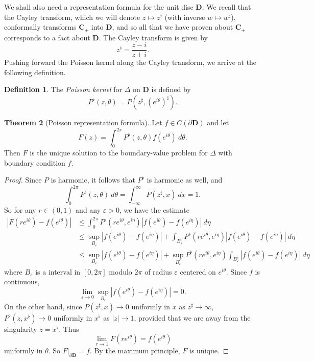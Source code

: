 \documentclass[12pt]{report}
\newcommand{\CC}{\mathbf{C}}
\newcommand{\DD}{\mathbf{D}}
\newcommand{\dfn}[1]{\emph{#1}\index{#1}}
\theoremstyle{definition}
\newtheorem{theorem}{Theorem}[chapter]
\newtheorem{definition}[theorem]{Definition}
\begin{document}
We shall also need a representation formula for the unit disc $\DD$. We recall that the Cayley transform, which we will denote $z \mapsto z^\flat$ (with inverse $w \mapsto w^\sharp$), conformally transforms $\CC_+$ into $\DD$, and so all that we have proven about $\CC_+$ corresponds to a fact about $\DD$. The Cayley transform is given by
$$z^\flat = \frac{z - i}{z + i}.$$
Pushing forward the Poisson kernel along the Cayley transform, we arrive at the following definition.
\begin{definition}
The \dfn{Poisson kernel} for $\Delta$ on $\DD$ is defined by
$$P^\flat(z, \theta) = P(z^\sharp, (e^{i\theta})^\sharp).$$
\end{definition}
\begin{theorem}[Poisson representation formula]
Let $f \in C(\partial \DD)$ and let
$$F(z) = \int_0^{2\pi} P^\flat(z, \theta)f(e^{i\theta}) ~d\theta.$$
Then $F$ is the unique solution to the boundary-value problem for $\Delta$ with boundary condition $f$.
\end{theorem}
\begin{proof}
Since $P$ is harmonic, it follows that $P^\flat$ is harmonic as well, and
$$\int_0^{2\pi} P^\flat(z, \theta) ~d\theta = \int_{-\infty}^\infty P(z^\sharp, x) ~dx = 1.$$
So for any $r \in (0, 1)$ and any $\varepsilon > 0$, we have the estimate
\begin{align*}
  |F(re^{i\theta}) - f(e^{i\theta})| &\leq \int_0^{2\pi} P^\flat(re^{i\theta}, e^{i\eta})|f(e^{i\theta}) - f(e^{i\eta})| ~d\eta\\
    &\leq \sup_{B_\varepsilon} |f(e^{i\theta}) - f(e^{i\eta})| + \int_{B_\varepsilon^c} P^\flat(re^{i\theta}, e^{i\eta})|f(e^{i\theta}) - f(e^{i\eta})| ~d\eta\\
    &\leq \sup_{B_\varepsilon} |f(e^{i\theta}) - f(e^{i\eta})| + \sup_{B_\varepsilon^c} P^\flat(re^{i\theta}, e^{i\eta}) \int_{B_\varepsilon^c} |f(e^{i\theta}) - f(e^{i\eta})| ~d\eta
\end{align*}
where $B_\varepsilon$ is a interval in $[0, 2\pi]$ modulo $2\pi$ of radius $\varepsilon$ centered on $e^{i\theta}$. Since $f$ is continuous,
$$\lim_{\varepsilon \to 0}\sup_{B_\varepsilon} |f(e^{i\theta}) - f(e^{i\eta})| = 0.$$
On the other hand, since $P(z^\sharp, x) \to 0$ uniformly in $x$ as $z^\sharp \to \infty$, $P^\flat(z, x^\flat) \to 0$ uniformly in $x^\flat$ as $|z| \to 1$, provided that we are away from the singularity $z = x^\flat$. Thus
$$\lim_{r \to 1} F(re^{i\theta}) = f(e^{i\theta})$$
uniformly in $\theta$. So $F|_{\partial \DD} = f$. By the maximum principle, $F$ is unique.
\end{proof}
\end{document}
